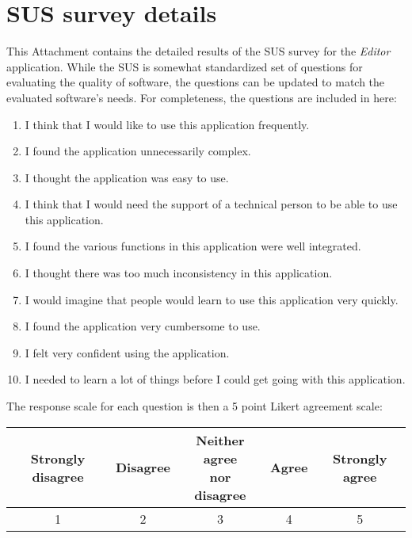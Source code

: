 \section{SUS survey details}
	\label{sec:sussurvey}
	This Attachment contains the detailed results of the \ac{SUS} survey for the \textit{Editor} application.
	While the \ac{SUS} is somewhat standardized set of questions for evaluating the quality of software,
	the questions can be updated to match the evaluated software's needs. For completeness, the questions are included in here:
	\begin{enumerate}
		\item I think that I would like to use this application frequently.
		\item I found the application unnecessarily complex.
		\item I thought the application was easy to use.
		\item I think that I would need the support of a technical person to be able to use this application.
		\item I found the various functions in this application were well integrated.
		\item I thought there was too much inconsistency in this application.
		\item I would imagine that people would learn to use this application very quickly.
		\item I found the application very cumbersome to use.
		\item I felt very confident using the application.
		\item I needed to learn a lot of things before I could get going with this application.
	\end{enumerate}
\smallskip
	The response scale for each question is then a 5 point Likert agreement scale:
	\begin{center}
	\begin{tabular}{c | c | c | c | c}
		Strongly disagree &	Disagree & \makecell{Neither agree\\ nor disagree} & Agree & Strongly agree \\
		\hline
1 & 2 & 3 & 4 & 5 \\
	\end{tabular}
	\end{center}

